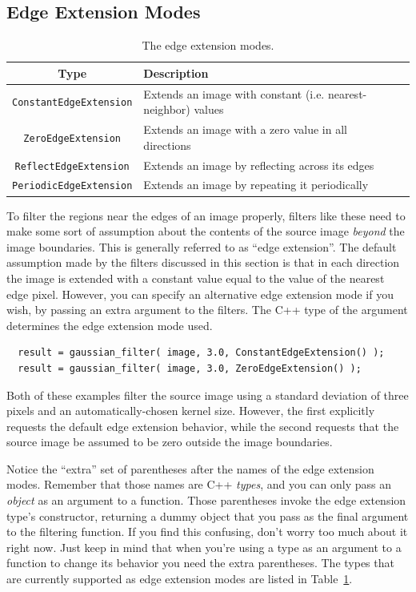 \subsection{Edge Extension Modes}
\label{sec:filter-edge-extend}

\begin{table}[t]\begin{centering}
\begin{tabular}{|c|l|l|} \hline
Type & Description \\ \hline \hline
\verb#ConstantEdgeExtension# & Extends an image with constant (i.e. nearest-neighbor) values \\ \hline
\verb#ZeroEdgeExtension# & Extends an image with a zero value in all directions \\ \hline
\verb#ReflectEdgeExtension# & Extends an image by reflecting across its edges \\ \hline
\verb#PeriodicEdgeExtension# & Extends an image by repeating it periodically \\ \hline
\end{tabular}
\caption{The edge extension modes.}
\label{tbl:edge-extension-modes}
\end{centering}\end{table}

To filter the regions near the edges of an image properly, 
filters like these need to make some sort of assumption 
about the contents of the source image {\it beyond} the 
image boundaries.  This is generally referred to as ``edge 
extension''.  The default assumption made by the filters 
discussed in this section is that in each direction the 
image is extended with a constant value equal to the value 
of the nearest edge pixel.  However, you can specify an 
alternative edge extension mode if you wish, by passing 
an extra argument to the filters.  The C++ type of the 
argument determines the edge extension mode used.  
\begin{verbatim}
  result = gaussian_filter( image, 3.0, ConstantEdgeExtension() );
  result = gaussian_filter( image, 3.0, ZeroEdgeExtension() );
\end{verbatim}
Both of these examples filter the source image using a 
standard deviation of three pixels and an automatically-chosen 
kernel size.  However, the first explicitly requests the 
default edge extension behavior, while the second requests 
that the source image be assumed to be zero outside the 
image boundaries.

Notice the ``extra'' set of parentheses after the names 
of the edge extension modes.  Remember that those names are 
C++ {\it types}, and you can only pass an {\it object} as an 
argument to a function.  Those parentheses invoke the 
edge extension type's constructor, returning a dummy 
object that you pass as the final argument to the filtering 
function.  If you find this confusing, don't worry too much 
about it right now.  Just keep in mind that when you're 
using a type as an argument to a function to change its 
behavior you need the extra parentheses.  The types that 
are currently supported as edge extension modes are listed 
in Table~\ref{tbl:edge-extension-modes}.

